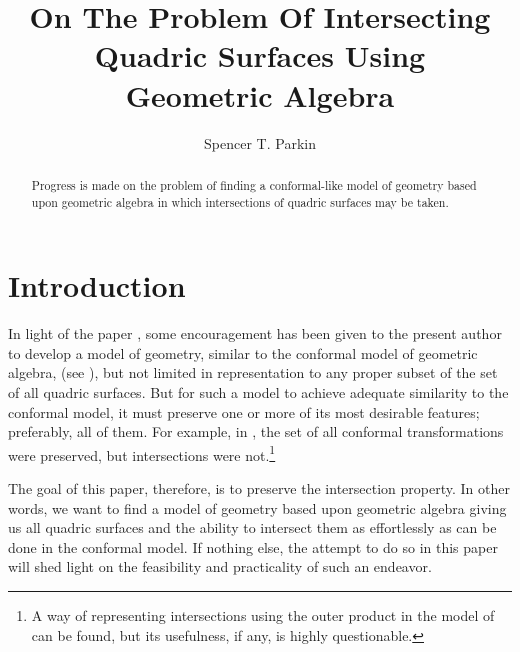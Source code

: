 \documentclass{birkjour}
\theoremstyle{definition}
\theoremstyle{remark}
\numberwithin{equation}{section}
\begin{document}
\title{On The Problem Of Intersecting\\Quadric Surfaces Using\\Geometric Algebra}

\author{Spencer T. Parkin}
\address{102 W. 500 S., \\
Salt Lake City, UT  84101} 



\begin{abstract}
Progress is made on the problem of finding a conformal-like model of geometry
based upon geometric algebra in which intersections of quadric surfaces
may be taken.
\end{abstract}


\maketitle

\section{Introduction}

In light of the paper \cite{Parkin13}, some encouragement has been given to the present
author to develop a model of geometry, similar to the conformal model of geometric
algebra, (see \cite{Hestenes01,Dorst07,Lasenby04}), but not limited in representation to any proper subset of the set of all
quadric surfaces.  But for such a model to achieve adequate similarity to the conformal model,
it must preserve one or more of its most desirable features; preferably, all of them.
For example, in \cite{Parkin13}, the set of all conformal transformations were preserved, but
intersections were not.\footnote{A way of representing intersections using the outer
product in the model of \cite{Parkin13} can be found, but its usefulness, if any, is highly questionable.}

The goal of this paper, therefore, is to
preserve the intersection property.  In other words, we want to find a model of geometry based upon
geometric algebra giving us all quadric surfaces and the ability to intersect them
as effortlessly as can be done in the conformal model.  If nothing else, the attempt
to do so in this paper will shed light on the feasibility and practicality of such an endeavor.
\end{document}
